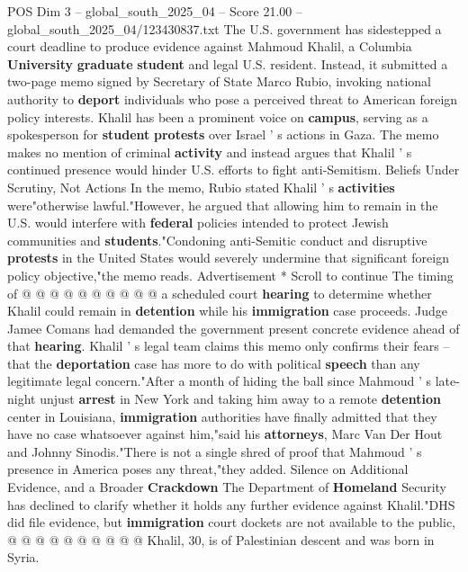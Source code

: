 \begin{textsample}{POS Dim 3 – global\_south\_2025\_04 – Score 21.00 – global\_south\_2025\_04/123430837.txt}  \label{ex:f3_pos_120}
The U.S. government has sidestepped a court deadline to produce evidence against Mahmoud Khalil, a Columbia \textbf{University} \textbf{graduate} \textbf{student} and legal U.S. resident.
Instead, it submitted a two-page memo signed by Secretary of State Marco Rubio, invoking national authority to \textbf{deport} individuals who pose a perceived threat to American foreign policy interests.
Khalil has been a prominent voice on \textbf{campus}, serving as a spokesperson for \textbf{student} \textbf{protests} over Israel ' s actions in Gaza.
The memo makes no mention of criminal \textbf{activity} and instead argues that Khalil ' s continued presence would hinder U.S. efforts to fight anti-Semitism.
Beliefs Under Scrutiny, Not Actions In the memo, Rubio stated Khalil ' s \textbf{activities} were"otherwise lawful."However, he argued that allowing him to remain in the U.S. would interfere with \textbf{federal} policies intended to protect Jewish communities and \textbf{students}."Condoning anti-Semitic conduct and disruptive \textbf{protests} in the United States would severely undermine that significant foreign policy objective,"the memo reads.
Advertisement * Scroll to continue The timing of @ @ @ @ @ @ @ @ @ @ a scheduled court \textbf{hearing} to determine whether Khalil could remain in \textbf{detention} while his \textbf{immigration} case proceeds.
Judge Jamee Comans had demanded the government present concrete evidence ahead of that \textbf{hearing}.
Khalil ' s legal team claims this memo only confirms their fears -- that the \textbf{deportation} case has more to do with political \textbf{speech} than any legitimate legal concern."After a month of hiding the ball since Mahmoud ' s late-night unjust \textbf{arrest} in New York and taking him away to a remote \textbf{detention} center in Louisiana, \textbf{immigration} authorities have finally admitted that they have no case whatsoever against him,"said his \textbf{attorneys}, Marc Van Der Hout and Johnny Sinodis."There is not a single shred of proof that Mahmoud ' s presence in America poses any threat,"they added.
Silence on Additional Evidence, and a Broader \textbf{Crackdown} The Department of \textbf{Homeland} Security has declined to clarify whether it holds any further evidence against Khalil."DHS did file evidence, but \textbf{immigration} court dockets are not available to the public, @ @ @ @ @ @ @ @ @ @ Khalil, 30, is of Palestinian descent and was born in Syria.

\end{textsample}
